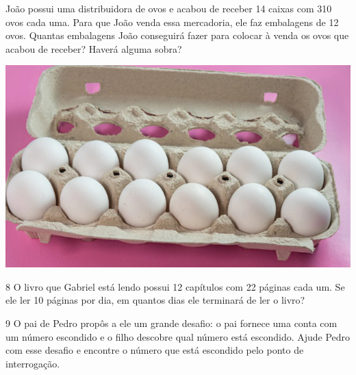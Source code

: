 \begin{minipage}{.5\textwidth}
João
possui uma distribuidora de ovos e acabou de receber 14 caixas com 310
ovos cada uma. Para que João venda essa mercadoria, ele faz embalagens
de 12 ovos. Quantas embalagens João conseguirá fazer para
colocar à venda os ovos que acabou de receber? Haverá alguma sobra?
\end{minipage}\hspace{.5cm}
\begin{minipage}{.5\textwidth}
\includegraphics[width=\textwidth]{media/image15.png}
\end{minipage}

\begin{mdframed}[linewidth=2pt,linecolor=salmao,roundcorner=2pt]

\end{mdframed}

\num{8} O livro que Gabriel está lendo possui 12 capítulos com 22 páginas cada
um. Se ele ler 10 páginas por dia, em quantos dias ele terminará de ler
o livro?

\begin{mdframed}[linewidth=2pt,linecolor=salmao,roundcorner=2pt]
\vspace{2cm}
\end{mdframed}

\num{9} O pai de Pedro propôs a ele um grande desafio:
o pai fornece uma conta com um número escondido e o filho 
descobre qual número está escondido. Ajude Pedro com esse desafio e
encontre o número que está escondido pelo ponto de interrogação.

